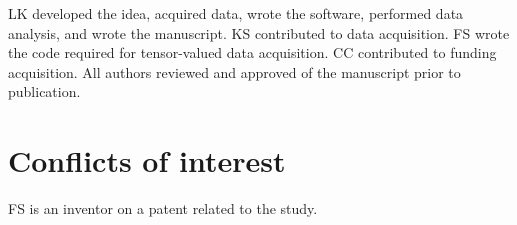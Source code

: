 \documentclass[10pt, letterpaper, oneside]{article}
\begin{document}
LK developed the idea, acquired data, wrote the software, performed data analysis, and wrote the manuscript. KS contributed to data acquisition. FS wrote the code required for tensor-valued data acquisition. CC contributed to funding acquisition. All authors reviewed and approved of the manuscript prior to publication.

\section*{Conflicts of interest}

FS is an inventor on a patent related to the study.

\newpage



\end{document}
